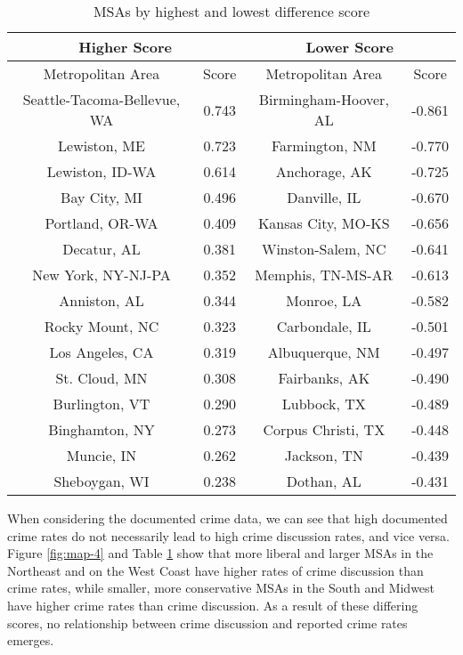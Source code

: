 \documentclass[12pt,oneside, letterpaper]{book}
\begin{document}
\begin{table}[h!]
    \centering
    \caption{MSAs by highest and lowest difference score}
    \begin{tabular}{| c | c | c | c |}
    \hline
    \multicolumn{2}{|c|}{Higher Score} & \multicolumn{2}{|c|}{Lower Score} \\ \hline
    Metropolitan Area & Score & Metropolitan Area & Score \\ \hline
    Seattle-Tacoma-Bellevue, WA & 0.743 & Birmingham-Hoover, AL & -0.861 \\ \hline
    Lewiston, ME & 0.723 & Farmington, NM & -0.770 \\ \hline
    Lewiston, ID-WA & 0.614 & Anchorage, AK & -0.725 \\ \hline
    Bay City, MI & 0.496 & Danville, IL & -0.670 \\ \hline
    Portland, OR-WA & 0.409 & Kansas City, MO-KS & -0.656 \\ \hline
    Decatur, AL & 0.381 & Winston-Salem, NC & -0.641 \\ \hline
    New York, NY-NJ-PA & 0.352 & Memphis, TN-MS-AR & -0.613 \\ \hline
    Anniston, AL & 0.344 & Monroe, LA & -0.582 \\ \hline
    Rocky Mount, NC & 0.323 & Carbondale, IL & -0.501 \\ \hline
    Los Angeles, CA & 0.319 & Albuquerque, NM & -0.497 \\ \hline
    St. Cloud, MN & 0.308 & Fairbanks, AK & -0.490 \\ \hline
    Burlington, VT & 0.290 & Lubbock, TX & -0.489 \\ \hline
    Binghamton, NY & 0.273 & Corpus Christi, TX & -0.448 \\ \hline
    Muncie, IN & 0.262 & Jackson, TN & -0.439 \\ \hline
    Sheboygan, WI & 0.238 & Dothan, AL & -0.431 \\ \hline
	\end{tabular}
	\label{table:table-5}
\end{table}

\par When considering the documented crime data, we can see that high documented crime rates do not necessarily lead to high crime discussion rates, and vice versa. Figure \ref{fig:map-4} and Table \ref{table:table-5} show that more liberal and larger MSAs in the Northeast and on the West Coast have higher rates of crime discussion than crime rates, while smaller, more conservative MSAs in the South and Midwest have higher crime rates than crime discussion. As a result of these differing scores, no relationship between crime discussion and reported crime rates emerges.
\end{document}
